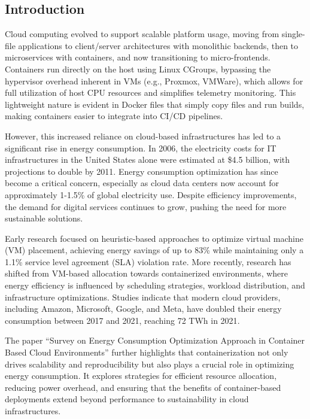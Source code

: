 \begin{multicols}{2}
\tableofcontents
\section{Introduction}
Cloud computing evolved to support scalable platform usage, moving from single-file applications to client/server 
architectures with monolithic backends, then to microservices with containers, and now transitioning to micro-frontends. 
Containers run directly on the host using Linux CGroups, bypassing the hypervisor overhead inherent in VMs (e.g., 
Proxmox, VMWare), which allows for full utilization of host CPU resources and simplifies telemetry monitoring. 
This lightweight nature is evident in Docker files that simply copy files and run builds, making containers easier to integrate 
into CI/CD pipelines.

However, this increased reliance on cloud-based infrastructures has led to a significant rise in energy 
consumption. In 2006, the electricity costs for IT infrastructures in the United States alone were 
estimated at \$4.5 billion, with projections to double by 2011\cite{beloglazov_energy_2010}. Energy 
consumption optimization has since become a critical concern, especially as cloud data centers now account 
for approximately 1-1.5\% of global electricity use\cite{IEADataCentres}. Despite efficiency improvements, the 
demand for digital services continues to grow, pushing the need for more sustainable solutions.

Early research focused on heuristic-based approaches to optimize virtual machine (VM) placement, achieving 
energy savings of up to 83\% while maintaining only a 1.1\% service level agreement (SLA) violation 
rate\cite{beloglazov_energy_2010}. More recently, research has shifted from VM-based allocation towards 
containerized environments, where energy efficiency is influenced by scheduling strategies, workload 
distribution, and infrastructure optimizations. Studies indicate that modern cloud providers, including 
Amazon, Microsoft, Google, and Meta, have doubled their energy consumption between 2017 and 2021, 
reaching 72 TWh in 2021\cite{masanet_2020, hintemann_2022, IEADataCentres}.

The paper ``Survey on Energy Consumption Optimization Approach in Container Based Cloud Environments'' 
further highlights that containerization not only drives scalability and 
reproducibility but also plays a crucial role in optimizing energy consumption. It 
explores strategies for efficient resource allocation, reducing power overhead, and 
ensuring that the benefits of container-based deployments extend beyond performance 
to sustainability in cloud infrastructures.


\end{multicols}
